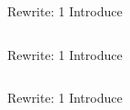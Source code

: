 \begin{frame}{Rewrite: 1}
  Introduce \colorbox{pink!30}{}

  \begin{columns}
    \begin{column}{0.5\textwidth}
      \usebox\typecaseAbox
    \end{column}
    \begin{column}{0.5\textwidth}  %
      \usebox\typecaseBabox
    \end{column}    
  \end{columns}
\end{frame}

\begin{frame}{Rewrite: 1}
  Introduce \colorbox{pink!30}{}

  \begin{columns}
    \begin{column}{0.5\textwidth}
      \usebox\typecaseAbox
    \end{column}
    \begin{column}{0.5\textwidth}  %
      \usebox\typecaseBbox
    \end{column}    
  \end{columns}
\end{frame}

\begin{frame}{Rewrite: 1}
  Introduce \colorbox{pink!30}{}

  \begin{columns}
    \begin{column}{0.5\textwidth}
      \usebox\typecaseAbox
    \end{column}
    \begin{column}{0.5\textwidth}  %
      \usebox\typecaseBbox
    \end{column}    
  \end{columns}
\end{frame}


\def\myLeftArrow{\smash{
  \begin{tikzpicture}[baseline=-2mm]
    \useasboundingbox (-2,0);
    \node[single arrow,draw=black,fill=red!10,minimum width=5cm,minimum height=7cm,shape border rotate=180] at (0,-1) {};
  \end{tikzpicture}
}}

